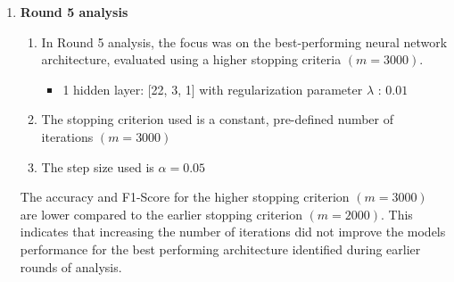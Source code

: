 \documentclass{article}
\begin{document}
\begin{enumerate}
\begin{enumerate}
\item In Round 4 analysis, the focus was on neural network architectures with one and two hidden layers, which achieved higher accuracy and F1-scores in earlier rounds.

\begin{itemize}
    \item 1 hidden layer: [22, 2, 1], [22, 3, 1] with regularization parameter $\lambda$ : $0.01$
    \item 2 hidden layer: [22, 8, 16, 1] with regularization parameter $\lambda$ : $0.0$

\end{itemize}
\item The stopping criterion used is a constant, pre-defined number of iterations $(m = 2000)$
\item The step size $\alpha$ takes values in $\{0.1, 0.025, 0.075, 0.01\}$.\\


\end{enumerate}

The results for the above high performing architectures, using different new values of the step size hyperparameter $\alpha$ $\{0.1, 0.025, 0.075, 0.01\}$, resulted in lower accuracy and F1-Score compared to previous rounds, indicating that these step size values did not improve the performance of the model for these high-performing architectures as expected.\\

\item \textbf{Round 5 analysis}
\begin{enumerate}
\item In Round 5 analysis, the focus was on the best-performing neural network architecture, evaluated using a higher stopping criteria $(m = 3000)$.

\begin{itemize}
    \item 1 hidden layer: [22, 3, 1] with regularization parameter $\lambda$ : $0.01$

\end{itemize}
\item The stopping criterion used is a constant, pre-defined number of iterations $(m = 3000)$
\item The step size used is $\alpha = 0.05$\\

\end{enumerate}

The accuracy and F1-Score for the higher stopping criterion $(m = 3000)$ are lower compared to the earlier stopping criterion $(m = 2000)$. This indicates that increasing the number of iterations did not improve the models performance for the best performing architecture identified during earlier rounds of analysis.


\end{enumerate}
\end{document}
